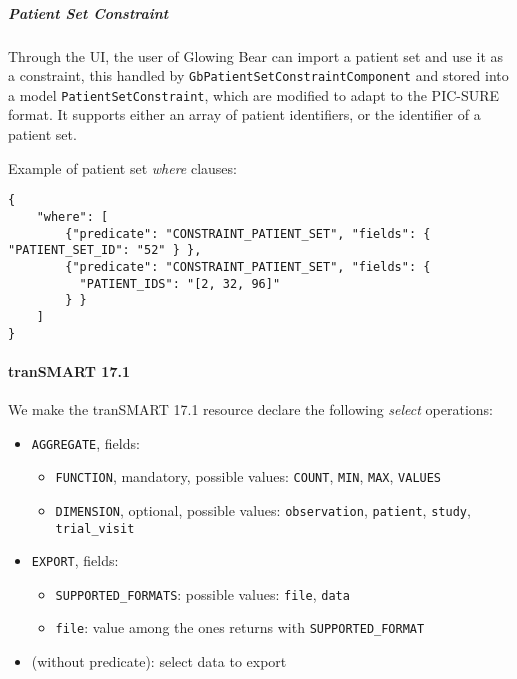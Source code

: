 \subparagraph{Patient Set Constraint}
Through the UI, the user of Glowing Bear can import a patient set and use it as a constraint, this handled by \verb|GbPatientSetConstraintComponent| and stored into a model \verb|PatientSetConstraint|, which are modified to adapt to the PIC-SURE format.
It supports either an array of patient identifiers, or the identifier of a patient set.

Example of patient set \emph{where} clauses:
\begin{verbatim}
{
    "where": [
        {"predicate": "CONSTRAINT_PATIENT_SET", "fields": { "PATIENT_SET_ID": "52" } },
        {"predicate": "CONSTRAINT_PATIENT_SET", "fields": { 
          "PATIENT_IDS": "[2, 32, 96]" 
        } }
    ]
}
\end{verbatim}

\paragraph{tranSMART 17.1}
\label{sec:irct-res-transmart-17.1}

We make the tranSMART 17.1 resource declare the following \emph{select} operations:
\begin{itemize}
    \item \verb|AGGREGATE|, fields:
    \begin{itemize}
        \item \verb|FUNCTION|, mandatory, possible values:
        \verb|COUNT|,
        \verb|MIN|,
        \verb|MAX|,
        \verb|VALUES|
        
        \item \verb|DIMENSION|, optional, possible values:
        \verb|observation|,
        \verb|patient|,
        \verb|study|,
        \verb|trial_visit|
    \end{itemize}
    
    \item \verb|EXPORT|, fields:
    \begin{itemize}
        \item \verb|SUPPORTED_FORMATS|: possible values: \verb|file|, \verb|data|
        \item \verb|file|: value among the ones returns with \verb|SUPPORTED_FORMAT|
    \end{itemize}
    
    \item (without predicate): select data to export
\end{itemize}

